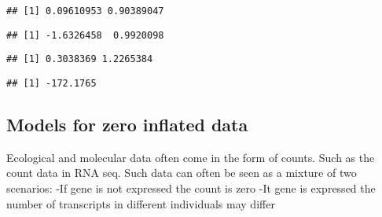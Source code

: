 \documentclass[]{article}
\newenvironment{Shaded}{\begin{snugshade}}{\end{snugshade}}
\newcommand{\NormalTok}[1]{#1}
\newcommand{\OperatorTok}[1]{\textcolor[rgb]{0.81,0.36,0.00}{\textbf{#1}}}
\begin{document}
\begin{Shaded}
\end{Shaded}

\begin{verbatim}
## [1] 0.09610953 0.90389047
\end{verbatim}

\begin{Shaded}
\end{Shaded}

\begin{verbatim}
## [1] -1.6326458  0.9920098
\end{verbatim}

\begin{Shaded}
\end{Shaded}

\begin{verbatim}
## [1] 0.3038369 1.2265384
\end{verbatim}

\begin{Shaded}
\end{Shaded}

\begin{verbatim}
## [1] -172.1765
\end{verbatim}

\hypertarget{models-for-zero-inflated-data}{%
\subsection{Models for zero inflated
data}\label{models-for-zero-inflated-data}}

Ecological and molecular data often come in the form of counts. Such as
the count data in RNA seq. Such data can often be seen as a mixture of
two scenarios: -If gene is not expressed the count is zero -It gene is
expressed the number of transcripts in different individuals may differ
\end{document}
